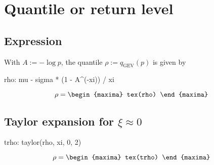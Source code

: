 
\section{Quantile or return level}

\subsection{Expression}


With $A:= -\log p$, the quantile $\rho := q_{\text{GEV}}(p)$ is given by
\begin{maxima}
  rho: mu - sigma * (1 -  A^(-xi)) / xi
\end{maxima}


\[
\rho=
\begin{maxima}
 tex(rho)
\end{maxima}
\]

\subsection{Taylor expansion for $\xi \approx 0$}

\begin{maxima}
  trho: taylor(rho, xi, 0, 2)
\end{maxima}
{\color{MonVertF}
\begin{equation*}
  \rho = 
  \begin{maxima}
    tex(trho)
  \end{maxima}
\end{equation*}}

